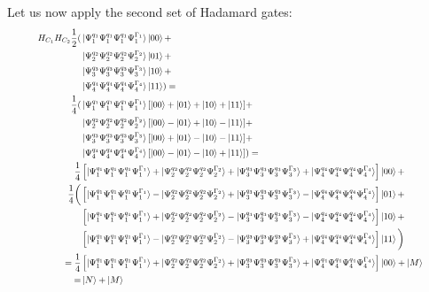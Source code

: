 Let us now apply the second set of Hadamard gates:
\begin{equation}
   \resizebox{.9\hsize}{!}{$\begin{split}
        H_{C_1}H_{C_2}\frac{1}{2}(
        &\ket{\Psi^{q_1}_1\Psi^{q_1}_1\Psi^{q_1}_1\Psi^{\Gamma_1}_1 }\ket{00}+\\
        &\ket{\Psi^{q_2}_2\Psi^{q_2}_2\Psi^{q_2}_2\Psi^{\Gamma_2}_2 }\ket{01}+\\
        &\ket{\Psi^{q_3}_3\Psi^{q_3}_3\Psi^{q_3}_3\Psi^{\Gamma_3}_3 }\ket{10}+\\
        &\ket{\Psi^{q_4}_4\Psi^{q_4}_4\Psi^{q_4}_4\Psi^{\Gamma_4}_4 }\ket{11}
        )=\\
        \frac{1}{4}(
            &\ket{\Psi^{q_1}_1\Psi^{q_1}_1\Psi^{q_1}_1\Psi^{\Gamma_1}_1 }[\ket{00}+
            \ket{01}+
            \ket{10}+
            \ket{11}]+\\
            &\ket{\Psi^{q_2}_2\Psi^{q_2}_2\Psi^{q_2}_2\Psi^{\Gamma_2}_2 }[\ket{00}-
            \ket{01}+
            \ket{10}-
            \ket{11}]+\\
            &\ket{\Psi^{q_3}_3\Psi^{q_3}_3\Psi^{q_3}_3\Psi^{\Gamma_3}_3 }[\ket{00}+
            \ket{01}-
            \ket{10}-
            \ket{11}]+\\
            &\ket{\Psi^{q_4}_4\Psi^{q_4}_4\Psi^{q_4}_4\Psi^{\Gamma_4}_4 }[\ket{00}-
            \ket{01}-
            \ket{10}+
            \ket{11}]
    ) =\\ 
        \frac{1}{4}&\left[\ket{\Psi^{q_1}_1\Psi^{q_1}_1\Psi^{q_1}_1\Psi^{\Gamma_1}_1 }+\ket{\Psi^{q_2}_2\Psi^{q_2}_2\Psi^{q_2}_2\Psi^{\Gamma_2}_2 }+\ket{\Psi^{q_3}_3\Psi^{q_3}_3\Psi^{q_3}_3\Psi^{\Gamma_3}_3 }+\ket{\Psi^{q_4}_4\Psi^{q_4}_4\Psi^{q_4}_4\Psi^{\Gamma_4}_4 }\right]\ket{00}+\\
    \frac{1}{4}\bigg(&\left[\ket{\Psi^{q_1}_1\Psi^{q_1}_1\Psi^{q_1}_1\Psi^{\Gamma_1}_1 }-\ket{\Psi^{q_2}_2\Psi^{q_2}_2\Psi^{q_2}_2\Psi^{\Gamma_2}_2 }+\ket{\Psi^{q_3}_3\Psi^{q_3}_3\Psi^{q_3}_3\Psi^{\Gamma_3}_3 }-\ket{\Psi^{q_4}_4\Psi^{q_4}_4\Psi^{q_4}_4\Psi^{\Gamma_4}_4 }\right]\ket{01}+\\
        &\left[\ket{\Psi^{q_1}_1\Psi^{q_1}_1\Psi^{q_1}_1\Psi^{\Gamma_1}_1 }+\ket{\Psi^{q_2}_2\Psi^{q_2}_2\Psi^{q_2}_2\Psi^{\Gamma_2}_2 }-\ket{\Psi^{q_3}_3\Psi^{q_3}_3\Psi^{q_3}_3\Psi^{\Gamma_3}_3 }-\ket{\Psi^{q_4}_4\Psi^{q_4}_4\Psi^{q_4}_4\Psi^{\Gamma_4}_4 }\right]\ket{10}+\\
        &\left[\ket{\Psi^{q_1}_1\Psi^{q_1}_1\Psi^{q_1}_1\Psi^{\Gamma_1}_1 }-\ket{\Psi^{q_2}_2\Psi^{q_2}_2\Psi^{q_2}_2\Psi^{\Gamma_2}_2 }-\ket{\Psi^{q_3}_3\Psi^{q_3}_3\Psi^{q_3}_3\Psi^{\Gamma_3}_3 }+\ket{\Psi^{q_4}_4\Psi^{q_4}_4\Psi^{q_4}_4\Psi^{\Gamma_4}_4 }\right]\ket{11}
    \bigg) \\= 
        \frac{1}{4}&\left[\ket{\Psi^{q_1}_1\Psi^{q_1}_1\Psi^{q_1}_1\Psi^{\Gamma_1}_1 }+\ket{\Psi^{q_2}_2\Psi^{q_2}_2\Psi^{q_2}_2\Psi^{\Gamma_2}_2 }+\ket{\Psi^{q_3}_3\Psi^{q_3}_3\Psi^{q_3}_3\Psi^{\Gamma_3}_3 }+\ket{\Psi^{q_4}_4\Psi^{q_4}_4\Psi^{q_4}_4\Psi^{\Gamma_4}_4 }\right]\ket{00}+\ket{M}\\=&\ket{N}+\ket{M}
   \end{split}$}
\end{equation}
